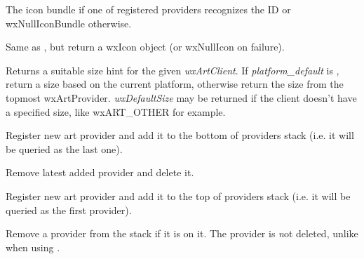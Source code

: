 
The icon bundle if one of registered providers recognizes the ID or wxNullIconBundle otherwise.


\label{wxartprovidergeticon}


Same as , but
return a wxIcon object (or wxNullIcon on failure).


Returns a suitable size hint for the given {\it wxArtClient}. If 
{\it platform\_default} is \true, return a size based on the current platform, 
otherwise return the size from the topmost wxArtProvider. {\it wxDefaultSize} may be 
returned if the client doesn't have a specified size, like wxART\_OTHER for example.


\label{wxartproviderinsert}


Register new art provider and add it to the bottom of providers stack (i.e.
it will be queried as the last one).




\label{wxartproviderctor}


Remove latest added provider and delete it.


\label{wxartproviderpush}


Register new art provider and add it to the top of providers stack (i.e. it
will be queried as the first provider).




\label{wxartproviderremove}


Remove a provider from the stack if it is on it. The provider is {\emph not} 
deleted, unlike when using .

